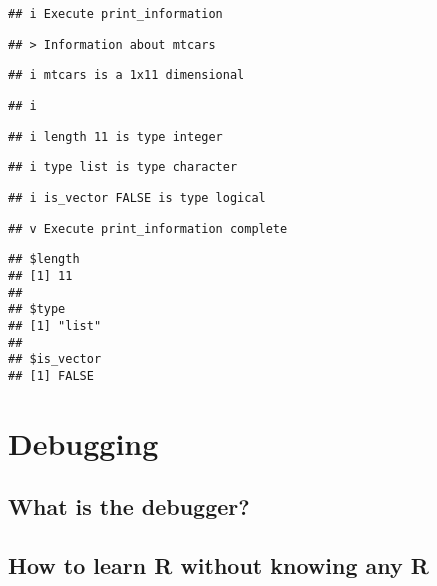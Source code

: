 \documentclass[
]{book}
\begin{document}
\begin{verbatim}
## i Execute print_information
\end{verbatim}

\begin{verbatim}
## > Information about mtcars
\end{verbatim}

\begin{verbatim}
## i mtcars is a 1x11 dimensional
\end{verbatim}

\begin{verbatim}
## i
\end{verbatim}

\begin{verbatim}
## i length 11 is type integer
\end{verbatim}

\begin{verbatim}
## i type list is type character
\end{verbatim}

\begin{verbatim}
## i is_vector FALSE is type logical
\end{verbatim}

\begin{verbatim}
## v Execute print_information complete
\end{verbatim}

\begin{verbatim}
## $length
## [1] 11
## 
## $type
## [1] "list"
## 
## $is_vector
## [1] FALSE
\end{verbatim}

\hypertarget{debugging}{%
\chapter{Debugging}\label{debugging}}

\hypertarget{what-is-the-debugger}{%
\section{What is the debugger?}\label{what-is-the-debugger}}

\hypertarget{how-to-learn-r-without-knowing-any-r}{%
\section{How to learn R without knowing any R}\label{how-to-learn-r-without-knowing-any-r}}
\end{document}
